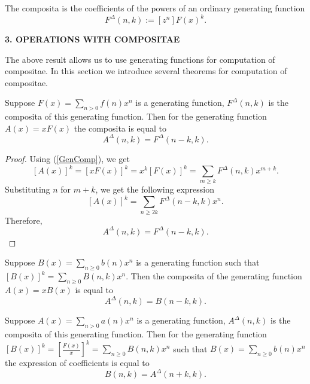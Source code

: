 \documentclass[12pt]{article}
\begin{document}
The composita is the coefficients of the powers of an ordinary generating function
$$F^{\Delta}(n,k) := [z^{n}] F(x)^k.$$



\vspace{1.5cc}
\begin{center}
{\bf 3. OPERATIONS WITH COMPOSITAE}
\end{center}

The above result allows us to use generating functions for computation of compositae. In this section we introduce several theorems for computation of compositae.


\begin{theorem}
\label{Theorem_shift}
 Suppose $F(x)=\sum_{n>0} f(n)x^n$ is a generating function, $F^{\Delta}(n,k)$ is the composita of this generating function. Then for the generating function $A(x)=xF(x)$  the composita is equal to 
\begin{equation}
A^{\Delta}(n,k)=F^{\Delta}(n-k,k).
\end{equation}
\end{theorem}

\begin{proof}
Using (\ref{GenComp}), we get
$$
[A(x)]^k=[xF(x)]^k=x^k[F(x)]^k=\sum_{m\geq  k} F^{\Delta}(n,k)x^{m+k}.
$$
Substituting $n$ for $m+k$, we get the following expression
$$[A(x)]^k=\sum_{n\geq  2k} F^{\Delta}(n-k,k)x^n.
$$
Therefore,
$$
A^{\Delta}(n,k)=F^{\Delta}(n-k,k).
$$
\end{proof}

\begin{corollary}
\label{compB(n,k)}
Suppose $B(x)=\sum_{n\geq 0} b(n)x^n$ is a generating function  such that $[B(x)]^k=\sum_{n\geq 0}B(n,k)x^n$. Then the composita of the generating function $A(x)=xB(x)$ is equal to
\begin{equation}
A^{\Delta}(n,k)=B(n-k,k).
\end{equation}
\end{corollary}

\begin{corollary}
\label{coeffB(n,k)}
Suppose $A(x)=\sum_{n>0} a(n)x^n$ is a generating function, $A^{\Delta}(n,k)$ is the composita of this generating function. Then for the generating function $[B(x)]^k=[\frac{F(x)}{x}]^k=\sum_{n\geq 0}B(n,k)x^n$ such that $B(x)=\sum_{n\geq 0} b(n)x^n$    the expression of coefficients is equal to 
\begin{equation}
B(n,k)=A^{\Delta}(n+k,k).
\end{equation}
\end{corollary}
\end{document}

